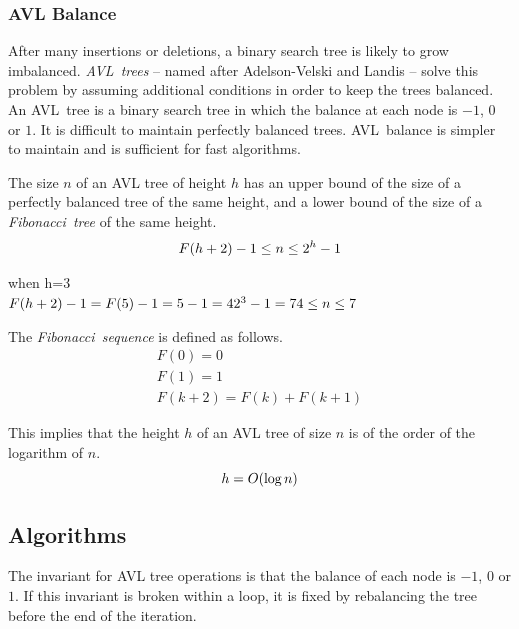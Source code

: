 \subsubsection{AVL Balance}

After many insertions or deletions, a binary search tree is likely to grow imbalanced.
\emph{AVL~trees} -- named after Adelson-Velski and Landis -- solve this problem by assuming additional conditions in order to keep the trees balanced.
An AVL~tree is a binary search tree in which the balance at each node is \( -1 \), \( 0 \) or \( 1 \).
It is difficult to maintain perfectly balanced trees.
AVL~balance is simpler to maintain and is sufficient for fast algorithms.

The size \( n \) of an AVL tree of height \( h \) has an upper bound of the size of a perfectly balanced tree of the same height, and a lower bound of the size of a \emph{Fibonacci~tree} of the same height.
\begin{equation*}
  F\!\left( h + 2 \right) - 1 \leq n \leq 2^{h} - 1 \\
\end{equation*}

when h=3 \\
\begin{math}
F(h+2)-1 = F(5)-1 = 5-1 = 4  \\
2^3-1 = 7 \\
4 \leq n \leq 7 \\
\end{math}

The \emph{Fibonacci~sequence} is defined as follows.
\begin{gather*}
  F\!\left( 0 \right) = 0 \\
  F\!\left( 1 \right) = 1 \\
  F\!\left( k + 2 \right) = F\!\left( k \right) + F\!\left( k + 1 \right)
\end{gather*}

This implies that the height \( h \) of an AVL tree of size \( n \) is of the order of the logarithm of \( n \).
\begin{equation*}
  h = O\!\left(\log n\right)
\end{equation*}

\subsection{Algorithms}

The invariant for AVL tree operations is that the balance of each node is \( -1 \), \( 0 \) or \( 1 \).
If this invariant is broken within a loop, it is fixed by rebalancing the tree before the end of the iteration.

